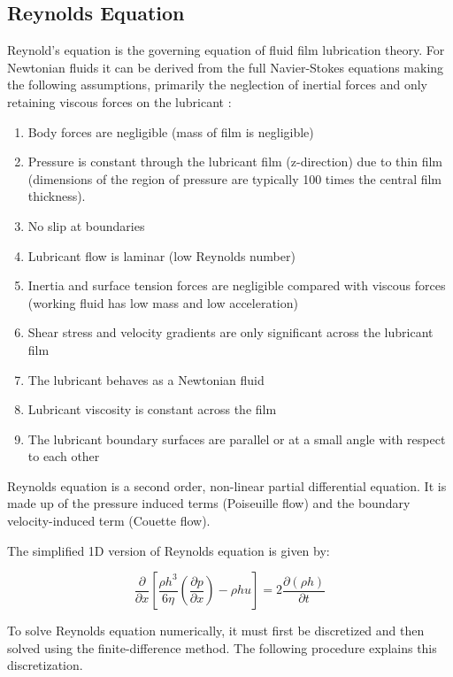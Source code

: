 \subsection{Reynolds Equation}

Reynold’s equation \cite{Reynolds1886} is the governing equation of fluid film lubrication theory. For Newtonian fluids it can be derived from the full Navier-Stokes equations making the following assumptions, primarily the neglection of inertial forces and only retaining viscous forces on the lubricant \cite{Gohar1988}:
\begin{enumerate} %
	\item Body forces are negligible (mass of film is negligible)
	\item Pressure is constant through the lubricant film (z-direction) due to thin film (dimensions of the region of pressure are typically 100 times the central film thickness).
	\item No slip at boundaries
	\item Lubricant flow is laminar (low Reynolds number)
	\item Inertia and surface tension forces are negligible compared with viscous forces (working fluid has low mass and low acceleration)
	\item Shear stress and velocity gradients are only significant across the lubricant film
	\item The lubricant behaves as a Newtonian fluid
	\item Lubricant viscosity is constant across the film
	\item The lubricant boundary surfaces are parallel or at a small angle with respect to each other
\end{enumerate}

Reynolds equation is a second order, non-linear partial differential equation. It is made up of the pressure induced terms (Poiseuille flow) and the boundary velocity-induced term (Couette flow). 

The simplified 1D version of Reynolds equation is given by:

\begin{equation}\label{eq3.1}
	\frac{\partial}{\partial x}\left[\frac{\rho h^{3}}{6 \eta}\left(\frac{\partial p}{\partial x}\right)-\rho h u\right]=2 \frac{\partial(\rho h)}{\partial t}
\end{equation}

To solve Reynolds equation numerically, it must first be discretized and then solved using the finite-difference method. The following procedure explains this discretization.

